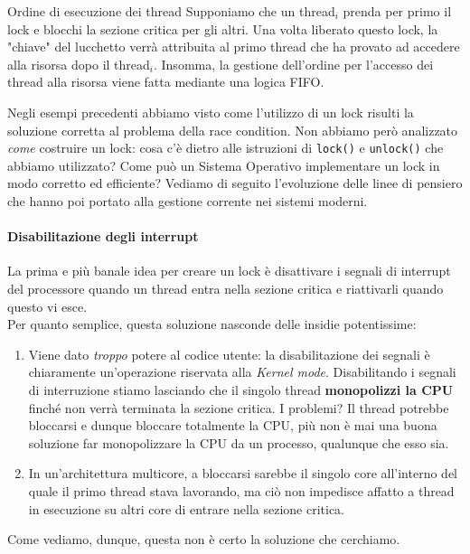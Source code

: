 \documentclass[12pt]{report}
\begin{document}
	\begin{osservazione}{Ordine di esecuzione dei thread}{}
		Supponiamo che un thread$_i$ prenda per primo il lock e blocchi la sezione critica per gli altri. Una volta liberato questo lock, la "chiave" del lucchetto verrà attribuita al primo thread che ha provato ad accedere alla risorsa dopo il thread$_i$. Insomma, la gestione dell'ordine per l'accesso dei thread alla risorsa viene fatta mediante una logica FIFO.
	\end{osservazione}
	
	Negli esempi precedenti abbiamo visto come l'utilizzo di un lock risulti la soluzione corretta al problema della race condition. Non abbiamo però analizzato \textit{come} costruire un lock: cosa c'è dietro alle istruzioni di \texttt{lock()} e \texttt{unlock()} che abbiamo utilizzato? Come può un Sistema Operativo implementare un lock in modo corretto ed efficiente? Vediamo di seguito l'evoluzione delle linee di pensiero che hanno poi portato alla gestione corrente nei sistemi moderni.
	
	\paragraph{Disabilitazione degli interrupt}
	La prima e più banale idea per creare un lock è disattivare i segnali di interrupt del processore quando un thread entra nella sezione critica e riattivarli quando questo vi esce.\\
	Per quanto semplice, questa soluzione nasconde delle insidie potentissime:
	\begin{enumerate}
		\item Viene dato \textit{troppo} potere al codice utente: la disabilitazione dei segnali è chiaramente un'operazione riservata alla \textit{Kernel mode}. Disabilitando i segnali di interruzione stiamo lasciando che il singolo thread \textbf{monopolizzi la CPU} finché non verrà terminata la sezione critica. I problemi? Il thread potrebbe bloccarsi e dunque bloccare totalmente la CPU, più non è mai una buona soluzione far monopolizzare la CPU da un processo, qualunque che esso sia.
		
		\item In un'architettura multicore, a bloccarsi sarebbe il singolo core all'interno del quale il primo thread stava lavorando, ma ciò non impedisce affatto a thread in esecuzione su altri core di entrare nella sezione critica.
	\end{enumerate}
	Come vediamo, dunque, questa non è certo la soluzione che cerchiamo.
	
\end{document}
